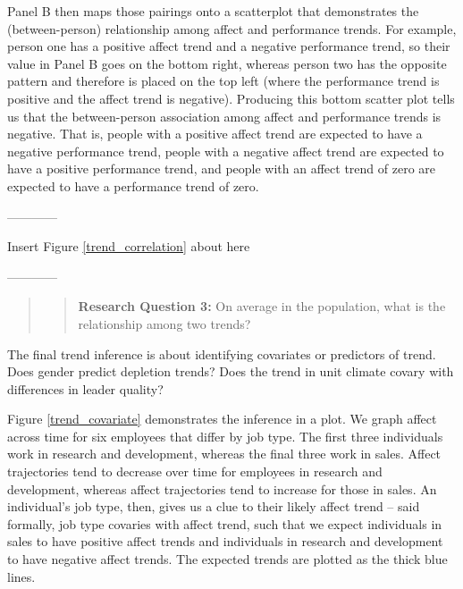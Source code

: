 \documentclass[english,,man]{apa6}
\begin{document}
Panel B then maps those pairings onto a scatterplot that demonstrates the (between-person) relationship among affect and performance trends. For example, person one has a positive affect trend and a negative performance trend, so their value in Panel B goes on the bottom right, whereas person two has the opposite pattern and therefore is placed on the top left (where the performance trend is positive and the affect trend is negative). Producing this bottom scatter plot tells us that the between-person association among affect and performance trends is negative. That is, people with a positive affect trend are expected to have a negative performance trend, people with a negative affect trend are expected to have a positive performance trend, and people with an affect trend of zero are expected to have a performance trend of zero.

\begin{center}

------------

Insert Figure \ref{trend_correlation} about here

------------

\end{center}

\begin{quote}
\begin{quote}
\textbf{Research Question 3:} On average in the population, what is the relationship among two trends?
\end{quote}
\end{quote}

The final trend inference is about identifying covariates or predictors of trend. Does gender predict depletion trends? Does the trend in unit climate covary with differences in leader quality?

Figure \ref{trend_covariate} demonstrates the inference in a plot. We graph affect across time for six employees that differ by job type. The first three individuals work in research and development, whereas the final three work in sales. Affect trajectories tend to decrease over time for employees in research and development, whereas affect trajectories tend to increase for those in sales. An individual's job type, then, gives us a clue to their likely affect trend -- said formally, job type covaries with affect trend, such that we expect individuals in sales to have positive affect trends and individuals in research and development to have negative affect trends. The expected trends are plotted as the thick blue lines.
\end{document}
